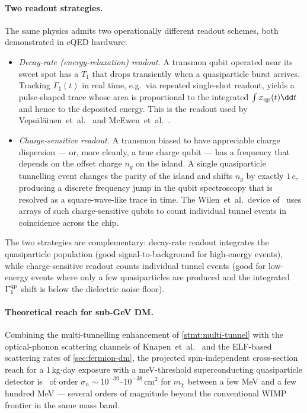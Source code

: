 \paragraph{Two readout strategies.}
The same physics admits two operationally different readout
schemes, both demonstrated in cQED hardware:
\begin{itemize}
  \item \emph{Decay-rate (energy-relaxation) readout.} A transmon
        qubit operated near its sweet spot has a $T_1$ that drops
        transiently when a quasiparticle burst arrives. Tracking
        $\Gamma_1(t)$ in real time, e.g.\ via repeated single-shot
        readout, yields a pulse-shaped trace whose area is
        proportional to the integrated $\int x_{\rm qp}(t)\dd t$
        and hence to the deposited energy. This is the readout
        used by Vepsäläinen~et~al.~\cite{vepsalainen2020} and
        McEwen~et~al.~\cite{mcewen2022}.
  \item \emph{Charge-sensitive readout.} A transmon biased to
        have appreciable charge dispersion --- or, more cleanly,
        a true charge qubit --- has a frequency that depends on
        the offset charge $n_g$ on the island. A single
        quasiparticle tunnelling event changes the parity of the
        island and shifts $n_g$ by exactly $1\,e$, producing a
        discrete frequency jump in the qubit spectroscopy that is
        resolved as a square-wave-like trace in time. The
        Wilen~et~al.\ device of~\cite{wilen2021} uses arrays of
        such charge-sensitive qubits to count individual tunnel
        events in coincidence across the chip.
\end{itemize}
The two strategies are complementary: decay-rate readout
integrates the quasiparticle population (good signal-to-background
for high-energy events), while charge-sensitive readout counts
individual tunnel events (good for low-energy events where only a
few quasiparticles are produced and the integrated $\Gamma_1^{\rm qp}$
shift is below the dielectric noise floor).

\paragraph{Theoretical reach for sub-GeV DM.}
Combining the multi-tunnelling enhancement of
\cref{stmt:multi-tunnel} with the optical-phonon scattering
channels of Knapen~et~al.~\cite{knapen2018} and the ELF-based
scattering rates of \cref{sec:fermion-dm}, the projected
spin-independent cross-section reach for a 1\,kg$\cdot$day
exposure with a meV-threshold superconducting quasiparticle
detector is~\cite{kurinsky2020,knapen2018} of order
$\sigma_n\sim 10^{-39}\text{--}10^{-38}\,\text{cm}^2$ for
$m_\chi$ between a few MeV and a few hundred MeV --- several
orders of magnitude beyond the conventional WIMP frontier in the
same mass band.


